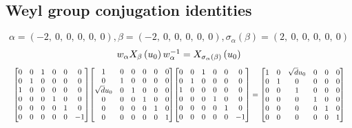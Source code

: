 \documentclass[11pt]{article}
\theoremstyle{definition}
\begin{document}
\subsection{Weyl group conjugation identities}

\providecommand{\scaletoalign}[2]{%
  \sbox0{$#2$}%
  \ifdim\wd0>#1\relax 
    \resizebox{#1}{!}{\usebox0}%
  \else 
    \usebox0%
  \fi 
}
\[
\alpha = \left( -2, \  0, \  0, \  0, \  0, \  0\right), \beta = \left( -2, \  0, \  0, \  0, \  0, \  0\right), \sigma_{\alpha}(\beta) = \left( 2, \  0, \  0, \  0, \  0, \  0\right)
\]
\[
\scaletoalign{\textwidth}{w_{\alpha} X_{\beta}\left(u_{0}\right) w_{\alpha}^{-1} = X_{\sigma_{\alpha}\left(\beta\right)}\left(u_{0}\right)}
\]
\[
\scaletoalign{\textwidth}{{\left[\begin{matrix}0 & 0 & 1 & 0 & 0 & 0\\0 & 1 & 0 & 0 & 0 & 0\\1 & 0 & 0 & 0 & 0 & 0\\0 & 0 & 0 & 1 & 0 & 0\\0 & 0 & 0 & 0 & 1 & 0\\0 & 0 & 0 & 0 & 0 & -1\end{matrix}\right]} {\left[\begin{matrix}1 & 0 & 0 & 0 & 0 & 0\\0 & 1 & 0 & 0 & 0 & 0\\\sqrt{d} u_{0} & 0 & 1 & 0 & 0 & 0\\0 & 0 & 0 & 1 & 0 & 0\\0 & 0 & 0 & 0 & 1 & 0\\0 & 0 & 0 & 0 & 0 & 1\end{matrix}\right]} {\left[\begin{matrix}0 & 0 & 1 & 0 & 0 & 0\\0 & 1 & 0 & 0 & 0 & 0\\1 & 0 & 0 & 0 & 0 & 0\\0 & 0 & 0 & 1 & 0 & 0\\0 & 0 & 0 & 0 & 1 & 0\\0 & 0 & 0 & 0 & 0 & -1\end{matrix}\right]} = {\left[\begin{matrix}1 & 0 & \sqrt{d} u_{0} & 0 & 0 & 0\\0 & 1 & 0 & 0 & 0 & 0\\0 & 0 & 1 & 0 & 0 & 0\\0 & 0 & 0 & 1 & 0 & 0\\0 & 0 & 0 & 0 & 1 & 0\\0 & 0 & 0 & 0 & 0 & 1\end{matrix}\right]}}
\]
\end{document}
